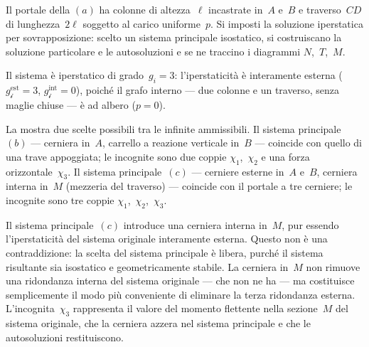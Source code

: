 \begin{esempio}
	\label{ese:portale_incastrato}
	Il portale della $(a)$ ha
	colonne di altezza~$\ell$ incastrate in~$A$ e~$B$ e traverso~$CD$
	di lunghezza~$2\ell$ soggetto al carico uniforme~$p$.
	Si imposti la soluzione iperstatica per sovrapposizione: scelto un
	sistema principale isostatico, si costruiscano la soluzione
	particolare e le autosoluzioni e se ne traccino i diagrammi
	$N$,~$T$,~$M$.
	
	\begin{svolgimento}
		
		Il sistema è iperstatico di grado~$g_i = 3$: l'iperstaticità
		è interamente esterna ($g_{\mathscr{i}}^{\text{est}} = 3$,
		$g_{\mathscr{i}}^{\text{int}} = 0$), poiché il grafo interno
		--- due colonne e un traverso, senza maglie chiuse --- è
		ad albero ($p = 0$).
		
		
		La  mostra due scelte
		possibili tra le infinite ammissibili.
		Il sistema principale~$(b)$ --- cerniera in~$A$, carrello
		a reazione verticale in~$B$ --- coincide con quello di una
		trave appoggiata; le incognite sono due coppie
		$\chi_1$,~$\chi_2$ e una forza orizzontale~$\chi_3$.
		Il sistema principale~$(c)$ --- cerniere esterne in~$A$
		e~$B$, cerniera interna in~$M$ (mezzeria del traverso) ---
		coincide con il portale a tre cerniere; le incognite
		sono tre coppie $\chi_1$,~$\chi_2$,~$\chi_3$.
		
		



		
		
		
		
		\begin{oss}
			Il sistema principale~$(c)$ introduce una cerniera
			interna in~$M$, pur essendo l'iperstaticità del
			sistema originale interamente esterna.
			Questo non è una contraddizione: la scelta del sistema
			principale è libera, purché il sistema risultante
			sia isostatico e geometricamente stabile.
			La cerniera in~$M$ non rimuove una ridondanza interna
			del sistema originale --- che non ne ha --- ma
			costituisce semplicemente il modo più conveniente
			di eliminare la terza ridondanza esterna.
			L'incognita~$\chi_3$ rappresenta il valore del
			momento flettente nella sezione~$M$ del sistema
			originale, che la cerniera azzera nel sistema
			principale e che le autosoluzioni restituiscono.
		\end{oss}
		

\end{svolgimento}
\end{esempio}
